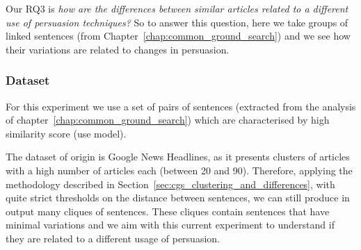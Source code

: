 Our RQ3 is \emph{how are the differences between similar articles related to a different use of persuasion techniques?}
So to answer this question, here we take groups of linked sentences (from Chapter~\ref{chap:common_ground_search}) and we see how their variations are related to changes in persuasion.

\subsubsection{Dataset}
\label{ssec:lp_relationship_small_variations_data}

For this experiment we use a set of pairs of sentences (extracted from the analysis of chapter~\ref{chap:common_ground_search}) which are characterised by high similarity score (\acrshort{use} model).

The dataset of origin is Google News Headlines, as it presents clusters of articles with a high number of articles each (between 20 and 90). Therefore, applying the methodology described in Section~\ref{sec:cgs_clustering_and_differences}, with quite strict thresholds on the distance between sentences, we can still produce in output many cliques of sentences. These cliques contain sentences that have minimal variations and we aim with this current experiment to understand if they are related to a different usage of persuasion.

